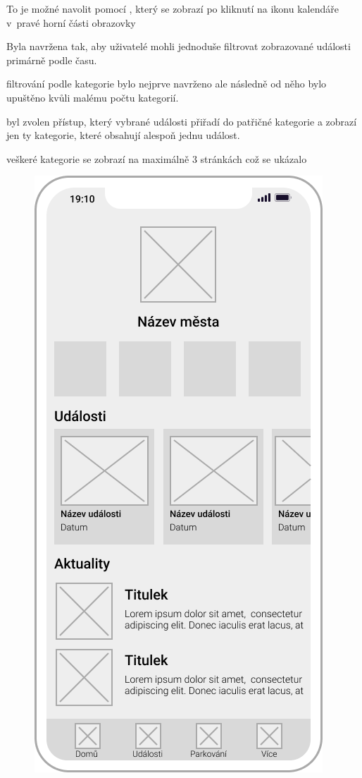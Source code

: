 \begin{minipage}[t]{0.45\textwidth}
  To je možné navolit pomocí , který se zobrazí po kliknutí na ikonu kalendáře v~pravé horní části obrazovky 
  
  
  
  Byla navržena tak, aby uživatelé mohli jednoduše filtrovat zobrazované události primárně podle času.
  
  filtrování podle kategorie bylo nejprve navrženo ale následně od něho bylo upuštěno kvůli malému počtu kategorií.
  
  byl zvolen přístup, který vybrané události přiřadí do patřičné kategorie a zobrazí jen ty kategorie, které obsahují alespoň jednu událost.
  
  veškeré kategorie se zobrazí na maximálně 3 stránkách což se ukázalo
\end{minipage}
\hfill
\begin{minipage}[t]{0.45\textwidth}
  \begin{figure}[H]
    \centering
    \includegraphics[width=.7\textwidth]{home_wireframe.png}

\end{figure}
\end{minipage}
